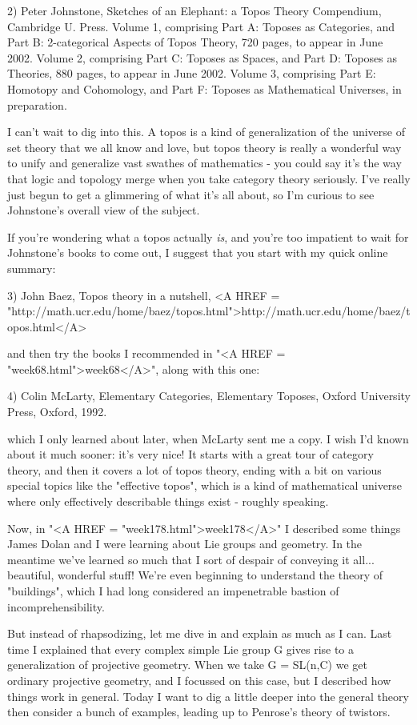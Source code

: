 2) Peter Johnstone, Sketches of an Elephant: a Topos Theory Compendium,
Cambridge U. Press.  Volume 1, comprising Part A: Toposes as Categories, 
and Part B: 2-categorical Aspects of Topos Theory, 720 pages, to appear 
in June 2002.  Volume 2, comprising Part C: Toposes as Spaces, and Part D: 
Toposes as Theories, 880 pages, to appear in June 2002.  Volume 3, 
comprising Part E: Homotopy and Cohomology, and Part F: Toposes as 
Mathematical Universes, in preparation.

I can't wait to dig into this.  A topos is a kind of generalization of
the universe of set theory that we all know and love, but topos theory
is really a wonderful way to unify and generalize vast swathes of
mathematics - you could say it's the way that logic and topology merge
when you take category theory seriously.  I've really just begun to get
a glimmering of what it's all about, so I'm curious to see Johnstone's
overall view of the subject.

If you're wondering what a topos actually \emph{is}, and you're too impatient
to wait for Johnstone's books to come out, I suggest that you start with
my quick online summary:

3) John Baez, Topos theory in a nutshell, <A HREF =
"http://math.ucr.edu/home/baez/topos.html">http://math.ucr.edu/home/baez/topos.html</A>

and then try the books I recommended in "<A HREF = "week68.html">week68</A>", along with
this one:

4) Colin McLarty, Elementary Categories, Elementary Toposes, 
Oxford University Press, Oxford, 1992.

which I only learned about later, when McLarty sent me a copy.  I wish
I'd known about it much sooner: it's very nice!  It starts with a great
tour of category theory, and then it covers a lot of topos theory,
ending with a bit on various special topics like 
the "effective topos",
which is a kind of mathematical universe where only effectively
describable things exist - roughly speaking.

Now, in "<A HREF = "week178.html">week178</A>" I described some 
things James Dolan and I were learning
about Lie groups and geometry.  In the meantime we've learned so much
that I sort of despair of conveying it all... beautiful, wonderful 
stuff!  We're even beginning to understand the theory of "buildings",
which I had long considered an impenetrable bastion of incomprehensibility.

But instead of rhapsodizing, let me dive in and explain as much as
I can.  Last time I explained that every complex simple Lie group G gives
rise to a generalization of projective geometry.  When we take G = SL(n,C)
we get ordinary projective geometry, and I focussed on this case, but
I described how things work in general.  Today I want to dig a little
deeper into the general theory then consider a bunch of examples, 
leading up to Penrose's theory of twistors.

